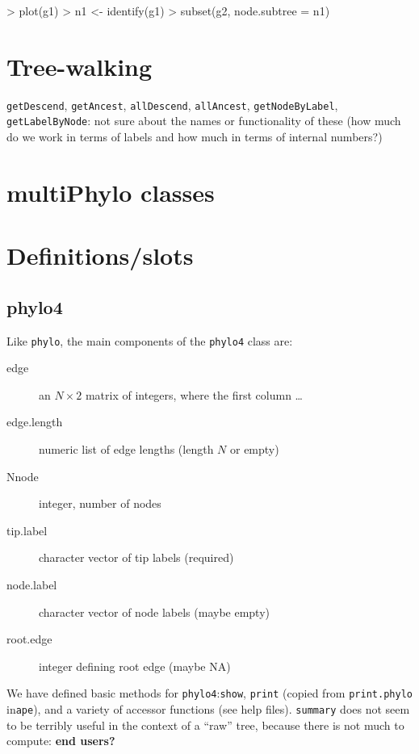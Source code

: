 \documentclass{article}
\newcommand{\code}[1]{{{\tt #1}}}
\begin{document}
\begin{Schunk}
\begin{Sinput}
> plot(g1)
> n1 <- identify(g1)
> subset(g2, node.subtree = n1)
\end{Sinput}
\end{Schunk}

\section{Tree-walking}

\code{getDescend}, \code{getAncest},
\code{allDescend}, \code{allAncest},
\code{getNodeByLabel}, \code{getLabelByNode}:
not sure about the names or functionality
of these (how much do we work in terms
of labels and how much in terms of internal
numbers?)

\section{multiPhylo classes}



\appendix
\section{Definitions/slots}

\subsection{phylo4}
Like \code{phylo}, the main components of
the \code{phylo4} class are:
\begin{description}
\item[edge]{an $N \times 2$ matrix of integers,
  where the first column \ldots}
\item[edge.length]{numeric list of edge lengths
(length $N$ or empty)}
\item[Nnode]{integer, number of nodes}
\item[tip.label]{character vector of tip labels (required)}
\item[node.label]{character vector of node labels (maybe empty)}
\item[root.edge]{integer defining root edge (maybe NA)}
\end{description}

We have defined basic methods for \code{phylo4}:\code{show}, \code{print} (copied from \code{print.phylo} in\code{ape}), and a variety of accessor functions (see help files). \code{summary} does not seem to be terribly useful in the context of a ``raw'' tree, because there is not much to compute: \textbf{end users?}
\end{document}
